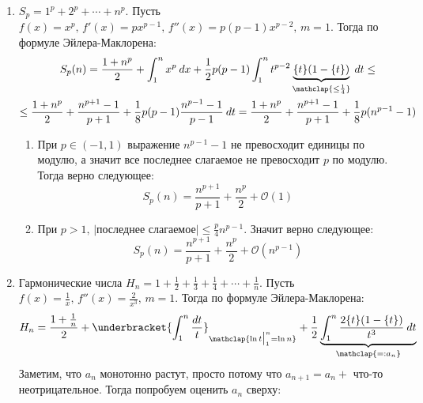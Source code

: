 \begin{examples}
  \begin{enumerate}
    \item $S_p = 1^p + 2^p + \dotsb + n^p$. Пусть $f(x) = x^p,\, f'(x) = px^{p - 1},\, f''(x) = p(p - 1)x^{p - 2},\, m = 1$. Тогда по формуле Эйлера-Маклорена:
    \begin{equation*}
      \begin{gathered}
        S_p(n) = \frac{1 + n^p}{2} + \int_{1}^{n} x^p \: dx + \frac{1}{2} p(p - 1) \int_{{1}}^{{n}} t^{p - 2}\underbrace{\{t\}(1 - \{t\})}_{\mathclap{\leq \frac{1}{4}}} \: d{t} \leq \\
        \leq \frac{1 + n^p}{2} + \frac{n^{p + 1} - 1}{p + 1} + \frac{1}{8}p(p - 1)
        \frac{n^{p - 1} - 1}{p - 1} \: dt =
        \frac{1 + n^p}{2} + \frac{n^{p + 1} - 1}{p + 1} + \frac{1}{8}p(n^{p - 1} - 1)
      \end{gathered}
    \end{equation*}
    \begin{enumerate}
        \item[] При $p \in (-1, 1)$ выражение $n^{p - 1} - 1$ не превосходит единицы по модулю, а значит все последнее слагаемое не превосходит $p$ по модулю. Тогда верно следующее:
        \begin{equation*}
            S_p(n) = \frac{n^{p + 1}}{p + 1} + \frac{n^p}{2} + \mathcal{O}(1)
        \end{equation*}
        \item[] При $p > 1, \, |\text{последнее слагаемое}| \leq \frac{p}{4} n^{p - 1}$. Значит верно следующее:
        \begin{equation*}
            S_p(n) = \frac{n^{p + 1}}{p + 1} + \frac{n^p}{2} + \mathcal{O}(n^{p - 1})
        \end{equation*}
    \end{enumerate}
    \item Гармонические числа $H_n = 1 + \frac{1}{2} + \frac{1}{3} + \frac{1}{4} + \dotsb + \frac{1}{n}$. Пусть $f(x) = \frac{1}{x}, \, f''(x) = \frac{2}{x^3}, \, m = 1$. Тогда по формуле Эйлера-Маклорена:
    \begin{equation*}
        H_n = \frac{1 + \frac{1}{n}}{2} + \underbracket{\int_{1}^{n} \frac{dt}{t}}_{\mathclap{\ln t \big|_{1}^{n} = \ln n}} +
        \frac{1}{2}\underbrace{\int_{1}^{n} \frac{2\{t\}(1 - \{t\})}{t^3} \: dt}_{\mathclap{=: a_n}}
    \end{equation*}
    Заметим, что $a_n$ монотонно растут, просто потому что $a_{n + 1} = a_n + $ что-то неотрицательное. Тогда попробуем оценить $a_n$ сверху:

\end{enumerate}
\end{examples}
